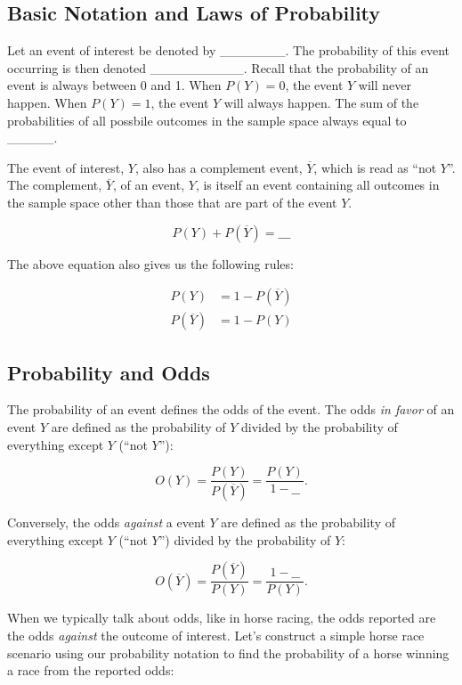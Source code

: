 \documentclass[]{book}
\theoremstyle{definition}
\theoremstyle{definition}
\theoremstyle{remark}
\begin{document}
\subsection{Basic Notation and Laws of
Probability}\label{basic-notation-and-laws-of-probability}

Let an event of interest be denoted by \_\_\_\_\_\_\_. The probability
of this event occurring is then denoted \_\_\_\_\_\_\_\_\_\_. Recall
that the probability of an event is always between 0 and 1. When
\(P(Y) = 0\), the event \(Y\) will never happen. When \(P(Y) = 1\), the
event \(Y\) will always happen. The sum of the probabilities of all
possbile outcomes in the sample space always equal to \_\_\_\_\_.

The event of interest, \(Y\), also has a complement event,
\(\overline{Y}\), which is read as ``not \(Y\)''. The complement,
\(\overline{Y}\), of an event, \(Y\), is itself an event containing all
outcomes in the sample space other than those that are part of the event
\(Y\).

\[ P(Y) + P(\overline{Y}) = \_\_\_\]

The above equation also gives us the following rules:

\begin{equation}\label{eq:1}
\begin{split}
P(Y) & = 1 - P(\overline{Y}) \\
 P(\overline{Y}) & = 1 - P(Y)
\end{split}
\end{equation}

\subsection{Probability and Odds}\label{probability-and-odds}

The probability of an event defines the odds of the event. The odds
\emph{in favor} of an event \(Y\) are defined as the probability of
\(Y\) divided by the probability of everything except \(Y\) (``not
\(Y\)''):

\[ O(Y) = \dfrac{P(Y)}{P(\overline{Y})} = \dfrac{P(Y)}{1-\_\_}.\]

Conversely, the odds \emph{against} a event \(Y\) are defined as the
probability of everything except \(Y\) (``not \(Y\)'') divided by the
probability of \(Y\):

\[ O(\overline{Y}) = \dfrac{P(\overline{Y})}{P(Y)} = \dfrac{1-\_\_}{P(Y)}.\]

When we typically talk about odds, like in horse racing, the odds
reported are the odds \emph{against} the outcome of interest. Let's
construct a simple horse race scenario using our probability notation to
find the probability of a horse winning a race from the reported odds:
\end{document}
